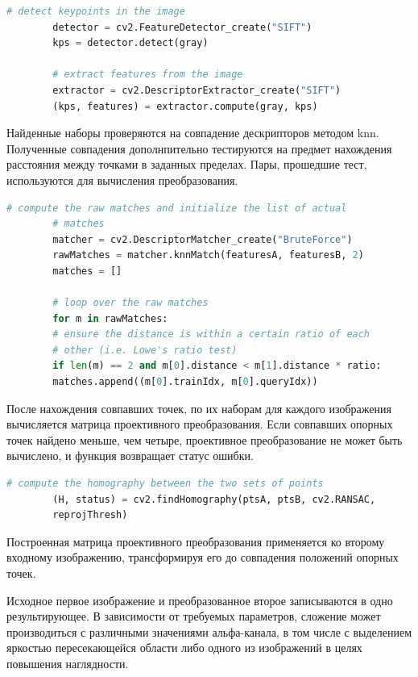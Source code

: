 {{{{   		\begin{lstlisting}[frame=single,language=Python,mathescape=true] 
   		# detect keypoints in the image
   		detector = cv2.FeatureDetector_create("SIFT")
   		kps = detector.detect(gray)
   		
   		# extract features from the image
   		extractor = cv2.DescriptorExtractor_create("SIFT")
   		(kps, features) = extractor.compute(gray, kps)
   		\end{lstlisting}
   		
   		Найденные наборы проверяются на совпадение дескрипторов методом knn. Полученные совпадения дополнпительно тестируются на предмет нахождения расстояния между точками в заданных пределах. Пары, прошедшие тест, используются для вычисления преобразования.
   		
   		\begin{lstlisting}[frame=single,language=Python,mathescape=true] 
   		# compute the raw matches and initialize the list of actual
   		# matches
   		matcher = cv2.DescriptorMatcher_create("BruteForce")
   		rawMatches = matcher.knnMatch(featuresA, featuresB, 2)
   		matches = []
   		
   		# loop over the raw matches
   		for m in rawMatches:
   		# ensure the distance is within a certain ratio of each
   		# other (i.e. Lowe's ratio test)
   		if len(m) == 2 and m[0].distance < m[1].distance * ratio:
   		matches.append((m[0].trainIdx, m[0].queryIdx))
   		\end{lstlisting}
   		
   		После нахождения совпавших точек, по их наборам для каждого изображения вычисляется матрица проективного преобразования.
   		Если совпавших опорных точек найдено меньше, чем четыре, проективное преобразование не может быть вычислено, и функция возвращает статус ошибки.
   		
   		\begin{lstlisting}[frame=single,language=Python,mathescape=true]
   		 # compute the homography between the two sets of points
   		(H, status) = cv2.findHomography(ptsA, ptsB, cv2.RANSAC,
   		reprojThresh)
   		\end{lstlisting}
   		
   		Построенная матрица проективного преобразования применяется ко второму входному изображению, трансформируя его до совпадения положений опорных точек.
   		
   		Исходное первое изображение и преобразованное второе записываются в одно результирующее. В зависимости от требуемых параметров, сложение может производиться с различными значениями альфа-канала, в том числе с выделением яркостью пересекающейся области либо одного из изображений в целях повышения наглядности.
   		
}}}}
